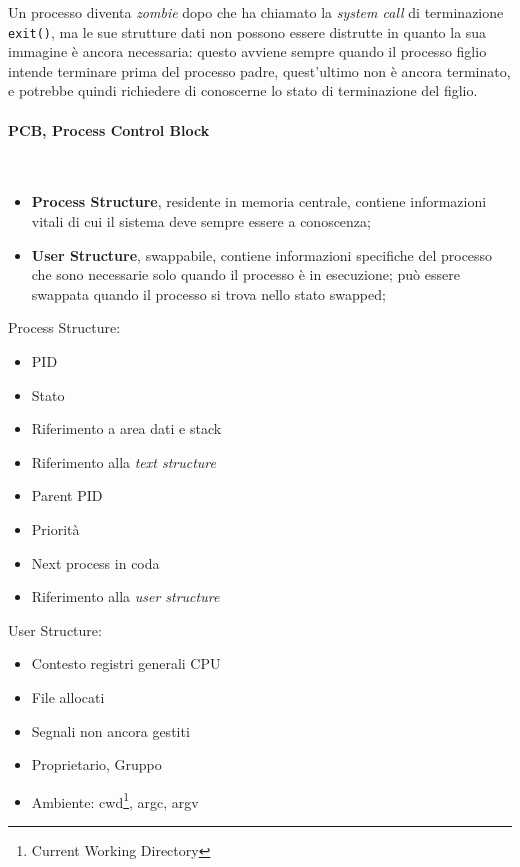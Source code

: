 \documentclass[12pt,a4paper]{article}
\begin{document}
Un processo diventa \emph{zombie} dopo che ha chiamato la \emph{system
call} di terminazione \texttt{exit()}, ma le sue strutture dati non
possono essere distrutte in quanto la sua immagine è
ancora necessaria: questo avviene sempre quando il processo
figlio intende terminare prima del processo padre, quest'ultimo non
è ancora terminato, e potrebbe quindi richiedere di conoscerne lo stato
di terminazione del figlio.

\paragraph{PCB, Process Control Block}\mbox{}\\
\begin{itemize}
  \item \textbf{Process Structure}, residente in memoria centrale,
    contiene informazioni vitali di cui il sistema deve sempre essere a
    conoscenza;
  \item \textbf{User Structure}, swappabile, contiene informazioni
    specifiche del processo che sono necessarie solo quando il processo
    è in esecuzione; può essere swappata quando il processo si trova
    nello stato swapped;
\end{itemize}

\begin{minipage}{1\linewidth}
\begin{minipage}{.45\linewidth}
Process Structure:
\begin{itemize}
  \item PID
  \item Stato
  \item Riferimento a area dati e stack
  \item Riferimento alla \emph{text structure}
  \item Parent PID
  \item Priorità
  \item Next process in coda
  \item Riferimento alla \emph{user structure}
\end{itemize}
\end{minipage}
\vline
\begin{minipage}{.45\linewidth}
User Structure:
\begin{itemize}
  \item Contesto registri generali CPU
  \item File allocati
  \item Segnali non ancora gestiti
  \item Proprietario, Gruppo
  \item Ambiente: cwd\footnote{Current Working Directory}, argc, argv
\end{itemize}
\end{minipage}
\end{minipage}
\end{document}
